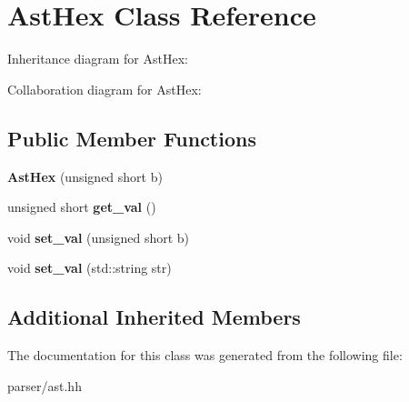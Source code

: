 \hypertarget{classAstHex}{}\section{Ast\+Hex Class Reference}
\label{classAstHex}


Inheritance diagram for Ast\+Hex\+:


Collaboration diagram for Ast\+Hex\+:
\subsection*{Public Member Functions}
\begin{DoxyCompactItemize}
\item 
\mbox{\label{classAstHex_a30d7aa9f55eaf2496ca6fb77f1e0ac97}} 
{\bfseries Ast\+Hex} (unsigned short b)
\item 
\mbox{\label{classAstHex_a35c238be824e355d08f9780b91c1fab4}} 
unsigned short {\bfseries get\+\_\+val} ()
\item 
\mbox{\label{classAstHex_a7a5304fdc4b9b98e3fe5f233ce54e750}} 
void {\bfseries set\+\_\+val} (unsigned short b)
\item 
\mbox{\label{classAstHex_ac0d159fb1a692b4c79b9fdf87fc8f0c8}} 
void {\bfseries set\+\_\+val} (std\+::string str)
\end{DoxyCompactItemize}
\subsection*{Additional Inherited Members}


The documentation for this class was generated from the following file\+:\begin{DoxyCompactItemize}
\item 
parser/ast.\+hh\end{DoxyCompactItemize}
